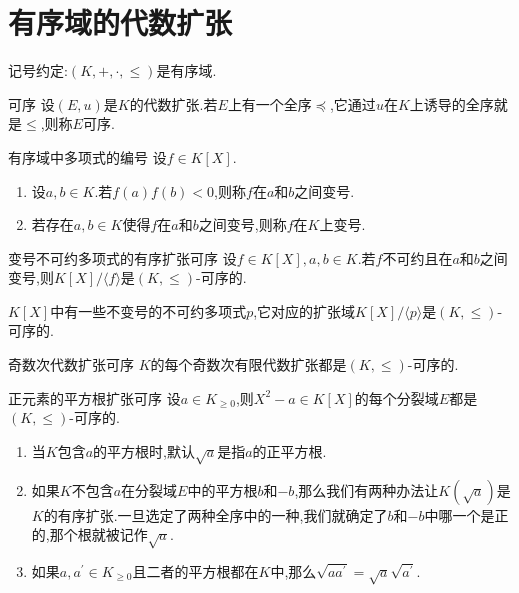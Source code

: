 \section{有序域的代数扩张}

记号约定:$\left(K,+,\cdot,\leq\right)$是有序域.

\begin{definition}{可序}{}
	设$\left(E,u\right)$是$K$的代数扩张.若$E$上有一个全序$\preccurlyeq$,它通过$u$在$K$上诱导的全序就是$\leqslant$,则称$E$可序.
\end{definition}

\begin{definition}{有序域中多项式的编号}{}
	设$f\in K\left[X\right]$.
	\begin{enumerate}
		\item 设$a,b\in K$.若$f\left(a\right)f\left(b\right)<0$,则称$f$在$a$和$b$之间变号.
		\item 若存在$a,b\in K$使得$f$在$a$和$b$之间变号,则称$f$在$K$上变号.
	\end{enumerate}
\end{definition}

\begin{proposition}{变号不可约多项式的有序扩张可序}{}
	设$f\in K\left[X\right],a,b\in K$.若$f$不可约且在$a$和$b$之间变号,则$K\left[X\right]/\langle f\rangle$是$\left(K,\leq\right)$-可序的.
\end{proposition}

\begin{remark}{}{}
	$K[X]$中有一些不变号的不可约多项式$p$,它对应的扩张域$K[X]/\langle p\rangle$是$\left(K,\leq\right)$-可序的.
\end{remark}

\begin{corollary}{奇数次代数扩张可序}{}
	$K$的每个奇数次有限代数扩张都是$\left(K,\leq\right)$-可序的.
\end{corollary}

\begin{corollary}{正元素的平方根扩张可序}{}
	设$a\in K_{\geq 0}$,则$X^{2}-a\in K[X]$的每个分裂域$E$都是$\left(K,\leq\right)$-可序的.
\end{corollary}

\begin{remark}{}{}
	\begin{enumerate}
		\item 当$K$包含$a$的平方根时,默认$\sqrt{a}$是指$a$的正平方根.
		\item 如果$K$不包含$a$在分裂域$E$中的平方根$b$和$-b$,那么我们有两种办法让$K(\sqrt{a})$是$K$的有序扩张.一旦选定了两种全序中的一种,我们就确定了$b$和$-b$中哪一个是正的,那个根就被记作$\sqrt{a}$.
		\item 如果$a,a^{\prime}\in K_{\geq 0}$且二者的平方根都在$K$中,那么$\sqrt{aa^{\prime}}=\sqrt{a}\sqrt{a^{\prime}}$.
	\end{enumerate}
\end{remark}